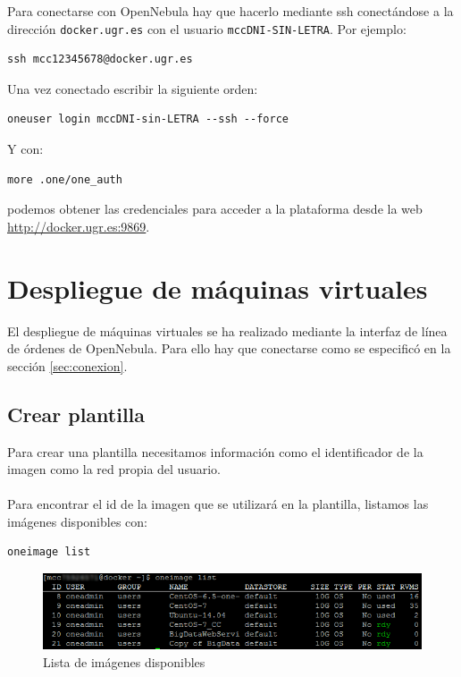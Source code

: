 Para conectarse con OpenNebula hay que hacerlo mediante ssh conectándose a la dirección \texttt{docker.ugr.es} con el usuario \texttt{mccDNI-SIN-LETRA}. Por ejemplo:

\begin{lstlisting}
ssh mcc12345678@docker.ugr.es
\end{lstlisting}

Una vez conectado escribir la siguiente orden: 

\begin{lstlisting}
oneuser login mccDNI-sin-LETRA --ssh --force
\end{lstlisting}

Y con: 

\begin{lstlisting}
more .one/one_auth
\end{lstlisting}

podemos obtener las credenciales para acceder a la plataforma desde la web \url{http://docker.ugr.es:9869}.

\section{Despliegue de máquinas virtuales}

El despliegue de máquinas virtuales se ha realizado mediante la interfaz de línea de órdenes de OpenNebula. Para ello hay que conectarse como se especificó en la sección \ref{sec:conexion}.

\label{sec:crear-plantilla}
\subsection{Crear plantilla}

Para crear una plantilla necesitamos información como el identificador de la imagen como la red propia del usuario.
\\ \\
Para encontrar el id de la imagen que se utilizará en la plantilla, listamos las imágenes disponibles con:

\begin{lstlisting}
oneimage list
\end{lstlisting}

\begin{figure}[H]
	\centering
	\includegraphics[width=14cm]{img/oneimage-list}
	\caption{Lista de imágenes disponibles}
	\label{fig:one-image-list}
\end{figure}

